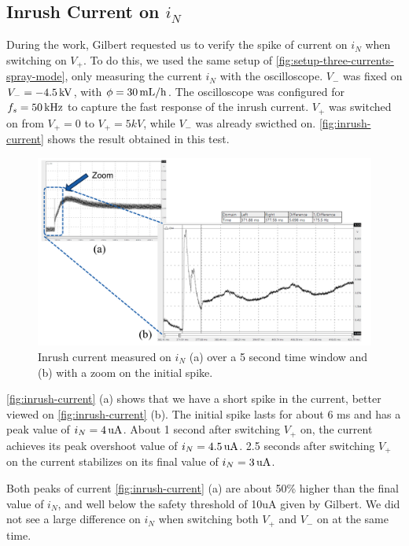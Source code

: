 \documentclass[oneside,12pt]{article}
\begin{document}
\subsection{Inrush Current on $i_N$}

During the work, Gilbert requested us to verify the spike of current on $i_N$ when switching on $V_+$. To do this, we used the same setup 
of \autoref{fig:setup-three-currents-spray-mode}, only measuring the current $i_N$ with the oscilloscope. $V_-$ was fixed on $V_- = - 4.5 \,\mathrm{kV}$, 
with $\phi = 30 \,\mathrm{mL/h}$. The oscilloscope was configured for $f_s = 50 \,\mathrm{kHz}$ to capture the fast response of the inrush current.
$V_+$ was switched on from $V_+ = 0$ to $V_+ = 5 kV$, while $V_-$ was already swicthed on. \autoref{fig:inrush-current} shows the result 
obtained in this test.

\begin{figure}[h!]
    \centering
    \includegraphics[width=\textwidth,trim=1 1 1 1,clip]{figures/inrush-current.png}
    \caption{Inrush current measured on $i_N$ (a) over a 5 second time window and (b) with a zoom on the initial spike.}
    \label{fig:inrush-current}
\end{figure}

\autoref{fig:inrush-current} (a) shows that we have a short spike in the current, better viewed on \autoref{fig:inrush-current} (b).
The initial spike lasts for about 6 ms and has a peak value of $i_N = 4 \,\mathrm{uA}$. About 1 second after switching $V_+$ on, the
current achieves its peak overshoot value of $i_N = 4.5 \,\mathrm{uA}$. 2.5 seconds after switching $V_+$ on the current stabilizes 
on its final value of $i_N = 3 \,\mathrm{uA}$.

Both peaks of current \autoref{fig:inrush-current} (a) are about 50\% higher than the final value of $i_N$, and well below the 
safety threshold of 10uA given by Gilbert. We did not see a large difference on $i_N$ when switching both $V_+$ and $V_-$ on at the 
same time. 
\end{document}
